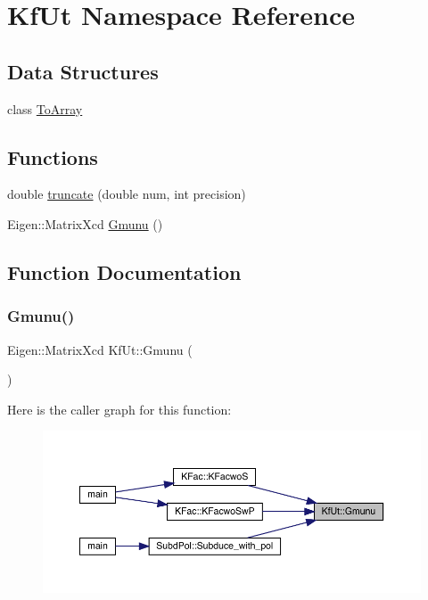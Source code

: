\hypertarget{namespaceKfUt}{}\section{Kf\+Ut Namespace Reference}
\label{namespaceKfUt}
\subsection*{Data Structures}
\begin{DoxyCompactItemize}
\item 
class \mbox{\hyperlink{classKfUt_1_1ToArray}{To\+Array}}
\end{DoxyCompactItemize}
\subsection*{Functions}
\begin{DoxyCompactItemize}
\item 
double \mbox{\hyperlink{namespaceKfUt_a155e8db38d770e216ef19d9938394c17}{truncate}} (double num, int precision)
\item 
Eigen\+::\+Matrix\+Xcd \mbox{\hyperlink{namespaceKfUt_ac090f8c3b57fe35c462bd3c3c2d8f08b}{Gmunu}} ()
\end{DoxyCompactItemize}


\subsection{Function Documentation}
\mbox{\label{namespaceKfUt_ac090f8c3b57fe35c462bd3c3c2d8f08b}} 
\subsubsection{\texorpdfstring{Gmunu()}{Gmunu()}}
{\footnotesize\ttfamily Eigen\+::\+Matrix\+Xcd Kf\+Ut\+::\+Gmunu (\begin{DoxyParamCaption}{ }\end{DoxyParamCaption})}

Here is the caller graph for this function\+:
\nopagebreak
\begin{figure}[H]
\begin{center}
\leavevmode
\includegraphics[width=350pt]{d8/da5/namespaceKfUt_ac090f8c3b57fe35c462bd3c3c2d8f08b_icgraph}
\end{center}
\end{figure}
\mbox{\label{namespaceKfUt_a155e8db38d770e216ef19d9938394c17}} 
